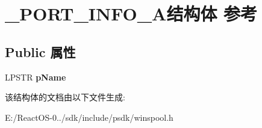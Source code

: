 \hypertarget{struct___p_o_r_t___i_n_f_o__1_a}{}\section{\+\_\+\+P\+O\+R\+T\+\_\+\+I\+N\+F\+O\+\_\+A结构体 参考}
\label{struct___p_o_r_t___i_n_f_o__1_a}
\subsection*{Public 属性}
\begin{DoxyCompactItemize}
\item 
\mbox{\label{struct___p_o_r_t___i_n_f_o__1_a_abdef23d56bc08a180615029ec4da35d4}} 
L\+P\+S\+TR {\bfseries p\+Name}
\end{DoxyCompactItemize}


该结构体的文档由以下文件生成\+:\begin{DoxyCompactItemize}
\item 
E\+:/\+React\+O\+S-\/0../sdk/include/psdk/winspool.\+h\end{DoxyCompactItemize}
